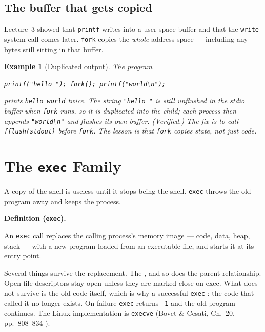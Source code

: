 \documentclass[11pt]{article}
\newtheorem{example}{Example}
\newenvironment{definitionbox}[1]{%
  \par\noindent\textbf{Definition (#1).}\ \itshape
}{\par\vspace{0.3em}}
\begin{document}
\subsection{The buffer that gets copied}

Lecture~3 showed that \texttt{printf} writes into a user-space buffer and that
the \texttt{write} system call comes later. \texttt{fork} copies the
\emph{whole} address space --- including any bytes still sitting in that
buffer.

\begin{example}[Duplicated output]
\label{ex:buffer}
The program
\begin{center}\texttt{printf("hello "); fork(); printf("world\textbackslash n");}\end{center}
\noindent prints \texttt{hello world} \emph{twice}. The string \texttt{"hello "} is still
unflushed in the stdio buffer when \texttt{fork} runs, so it is duplicated into
the child; each process then appends \texttt{"world\textbackslash n"} and
flushes its own buffer. (Verified.) The fix is to call \texttt{fflush(stdout)}
before \texttt{fork}. The lesson is that \texttt{fork} copies \emph{state}, not
just code.
\end{example}

\section{The \texttt{exec} Family}

A copy of the shell is useless until it stops being the shell. \texttt{exec}
throws the old program away and keeps the process.

\begin{definitionbox}{\texttt{exec}}
An \texttt{exec} call replaces the calling process's memory image --- code,
data, heap, stack --- with a new program loaded from an executable file, and
starts it at its entry point.
\end{definitionbox}

Several things survive the replacement. The , and so
does the parent relationship. Open file descriptors stay open unless they are
marked close-on-exec. What does not survive is the old code itself, which is
why a successful \texttt{exec} : the code that called it no
longer exists. On failure \texttt{exec} returns \texttt{-1} and the old program
continues. The Linux implementation is \texttt{execve}
(Bovet \& Cesati, Ch.~20, pp.~808--834 \cite{BovetCesati_understanding_linux_kernel}).
\end{document}
